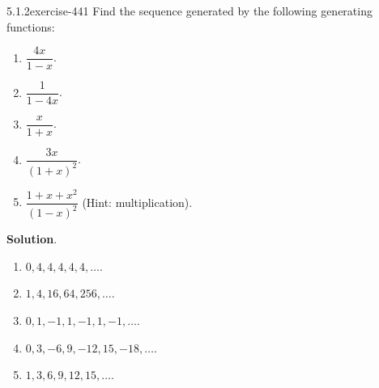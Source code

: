 \documentclass[twoside,11pt,]{book}
\numberwithin{equation}{chapter}
\begin{document}
\begin{divisionsolution}{5.1.2}{}{exercise-441}%
\hypertarget{p-5090}{}%
Find the sequence generated by the following generating functions:\leavevmode%
\begin{enumerate}[label=(\alph*)]
\item\hypertarget{li-2444}{}\(\dfrac{4x}{1-x}\).%
\item\hypertarget{li-2445}{}\(\dfrac{1}{1-4x}\).%
\item\hypertarget{li-2446}{}\(\dfrac{x}{1+x}\).%
\item\hypertarget{li-2447}{}\(\dfrac{3x}{(1+x)^2}\).%
\item\hypertarget{li-2448}{}\(\dfrac{1+x+x^2}{(1-x)^2}\) (Hint: multiplication).%
\end{enumerate}
%
\par\smallskip%
\noindent\textbf{Solution}.\quad%
\hypertarget{p-5091}{}%
\leavevmode%
\begin{enumerate}[label=(\alph*)]
\item\hypertarget{li-2449}{}\(0, 4, 4, 4, 4, 4, \ldots\).%
\item\hypertarget{li-2450}{}\(1, 4, 16, 64, 256, \ldots\).%
\item\hypertarget{li-2451}{}\(0, 1, -1, 1, -1, 1, -1, \ldots\).%
\item\hypertarget{li-2452}{}\(0, 3, -6, 9, -12, 15, -18, \ldots\).%
\item\hypertarget{li-2453}{}\(1, 3, 6, 9, 12, 15, \ldots\).%
\end{enumerate}
%
\end{divisionsolution}%
\end{document}

